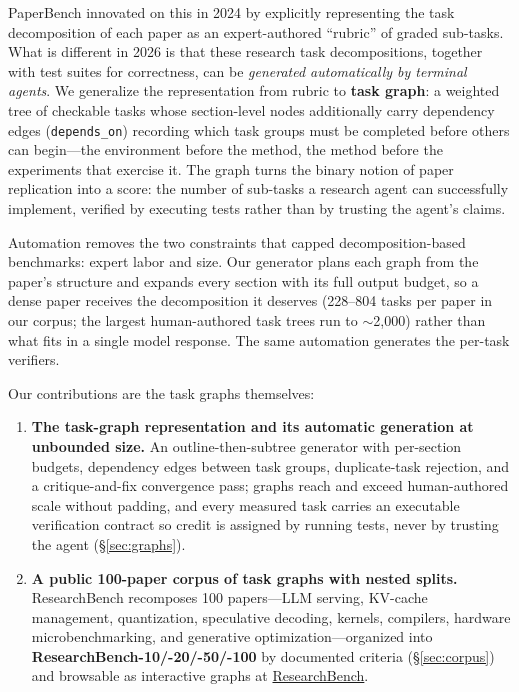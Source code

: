 \documentclass{article}
\begin{document}
PaperBench \citep{starace2025paperbench} innovated on this in 2024 by
explicitly representing the task decomposition of each paper as an
expert-authored ``rubric'' of graded sub-tasks. What is different in 2026 is
that these research task decompositions, together with test suites for
correctness, can be \emph{generated automatically by terminal agents}. We
generalize the representation from rubric to \textbf{task graph}: a weighted
tree of checkable tasks whose section-level nodes additionally carry
dependency edges (\texttt{depends\_on}) recording which task groups must be
completed before others can begin---the environment before the method, the
method before the experiments that exercise it. The graph turns the binary
notion of paper replication into a score: the number of sub-tasks a research
agent can successfully implement, verified by executing tests rather than by
trusting the agent's claims.

Automation removes the two constraints that capped decomposition-based
benchmarks: expert labor and size. Our generator plans each graph from the
paper's structure and expands every section with its full output budget, so a
dense paper receives the decomposition it deserves (228--804 tasks per paper
in our corpus; the largest human-authored task trees run to
$\sim$2{,}000) rather than what fits in a single model response. The same
automation generates the per-task verifiers.

Our contributions are the task graphs themselves:

\begin{enumerate}
  \item \textbf{The task-graph representation and its automatic generation at
        unbounded size.} An outline-then-subtree generator with per-section
        budgets, dependency edges between task groups, duplicate-task
        rejection, and a critique-and-fix convergence pass; graphs reach and
        exceed human-authored scale without padding, and every measured task
        carries an executable verification contract so credit is assigned by
        running tests, never by trusting the agent (\S\ref{sec:graphs}).
  \item \textbf{A public 100-paper corpus of task graphs with nested
        splits.} ResearchBench recomposes 100 papers---LLM serving, KV-cache
        management, quantization, speculative decoding, kernels, compilers,
        hardware microbenchmarking, and generative optimization---organized
        into \textbf{ResearchBench-10/-20/-50/-100} by documented criteria
        (\S\ref{sec:corpus}) and browsable as interactive graphs at \href{https://infinity-ai-institute.github.io/research-bench-rubrics/}{ResearchBench}.
\end{enumerate}
\end{document}
